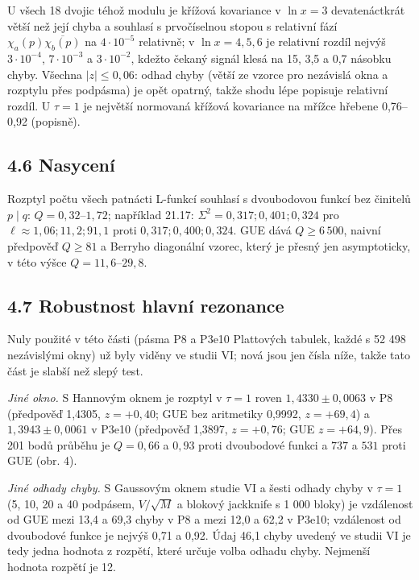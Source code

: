 \documentclass[
  10pt,
]{article}
\begin{document}
U všech 18 dvojic téhož modulu je křížová kovariance v \(\ln x = 3\)
devatenáctkrát větší než její chyba a souhlasí s prvočíselnou stopou s
relativní fází \(\chi_a(p)\overline{\chi_b(p)}\) na \(4\cdot10^{-5}\)
relativně; v \(\ln x = 4, 5, 6\) je relativní rozdíl nejvýš
\(3\cdot10^{-4}\), \(7\cdot10^{-3}\) a \(3\cdot10^{-2}\), kdežto čekaný
signál klesá na 15, 3,5 a 0,7 násobku chyby. Všechna \(|z| \le 0{,}06\):
odhad chyby (větší ze vzorce pro nezávislá okna a rozptylu přes
podpásma) je opět opatrný, takže shodu lépe popisuje relativní rozdíl. U
\(\tau = 1\) je největší normovaná křížová kovariance na mřížce hřebene
0,76--0,92 (popisně).

\hypertarget{nasycenuxed}{%
\subsection{4.6 Nasycení}\label{nasycenuxed}}

Rozptyl počtu všech patnácti L-funkcí souhlasí s dvoubodovou funkcí bez
činitelů \(p \mid q\): \(Q = 0{,}32\)--\(1{,}72\); například 21.17:
\(\Sigma^2 = 0{,}317; 0{,}401; 0{,}324\) pro
\(\ell \approx 1{,}06; 11{,}2; 91{,}1\) proti
\(0{,}317; 0{,}400; 0{,}324\). GUE dává \(Q \ge 6\,500\), naivní
předpověď \(Q \ge 81\) a Berryho diagonální vzorec, který je přesný jen
asymptoticky, v této výšce \(Q = 11{,}6\)--\(29{,}8\).

\hypertarget{robustnost-hlavnuxed-rezonance}{%
\subsection{4.7 Robustnost hlavní
rezonance}\label{robustnost-hlavnuxed-rezonance}}

Nuly použité v této části (pásma P8 a P3e10 Plattových tabulek, každé s
52 498 nezávislými okny) už byly viděny ve studii VI; nová jsou jen
čísla níže, takže tato část je slabší než slepý test.

\emph{Jiné okno.} S Hannovým oknem je rozptyl v \(\tau = 1\) roven
\(1{,}4330 \pm 0{,}0063\) v P8 (předpověď 1,4305, \(z = +0{,}40\); GUE
bez aritmetiky 0,9992, \(z = +69{,}4\)) a \(1{,}3943 \pm 0{,}0061\) v
P3e10 (předpověď 1,3897, \(z = +0{,}76\); GUE \(z = +64{,}9\)). Přes 201
bodů průběhu je \(Q = 0{,}66\) a \(0{,}93\) proti dvoubodové funkci a
\(737\) a \(531\) proti GUE (obr. 4).

\emph{Jiné odhady chyby.} S Gaussovým oknem studie VI a šesti odhady
chyby v \(\tau = 1\) (5, 10, 20 a 40 podpásem, \(V/\sqrt M\) a blokový
jackknife s 1 000 bloky) je vzdálenost od GUE mezi 13,4 a 69,3 chyby v
P8 a mezi 12,0 a 62,2 v P3e10; vzdálenost od dvoubodové funkce je nejvýš
0,71 a 0,92. Údaj 46,1 chyby uvedený ve studii VI je tedy jedna hodnota
z rozpětí, které určuje volba odhadu chyby. Nejmenší hodnota rozpětí je
12.
\end{document}
